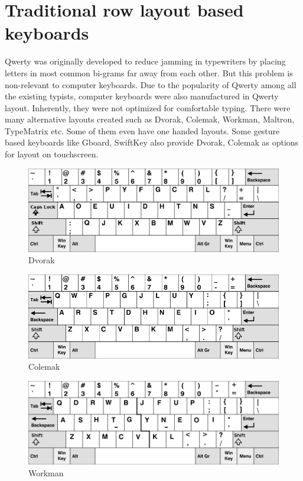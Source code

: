\documentclass[MTech]{iitmdiss}
\begin{document}
\section{Traditional row layout based keyboards}
Qwerty was originally developed to reduce jamming in typewriters by placing letters in most common bi-grams far away from each other. But this problem is non-relevant to computer keyboards. Due to the popularity of Qwerty among all the existing typists, computer keyboards were also manufactured in Qwerty layout. Inherently, they were not optimized for comfortable typing. There were many alternative layouts created such as Dvorak, Colemak, Workman, Maltron, TypeMatrix etc. Some of them even have one handed layouts. Some gesture based keyboards like Gboard, SwiftKey also provide Dvorak, Colemak as options for layout on touchscreen. 

\begin{figure}[h!]
	\centering
	\includegraphics[scale=0.35]{Images/dvorak}
	\caption{Dvorak}
\end{figure}

\begin{figure}[h!]
	\centering
	\includegraphics[scale=0.525]{Images/colemak}
	\caption{Colemak}
\end{figure}

\begin{figure}[h!]
	\centering
	\includegraphics[scale=0.47]{Images/workman}
	\caption{Workman}
\end{figure}
\end{document}
